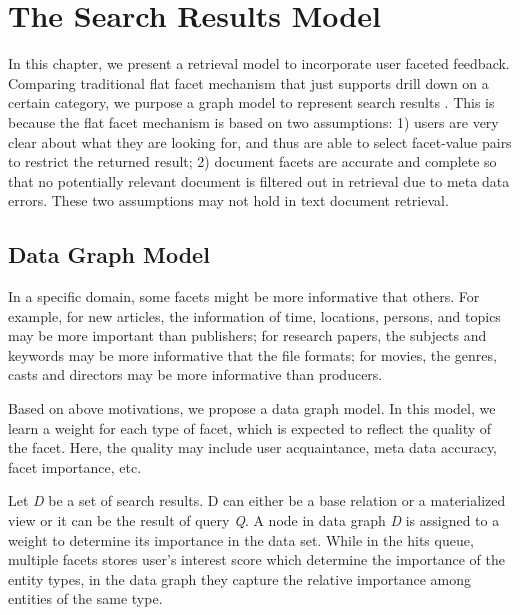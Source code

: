 \chapter{The Search Results Model}

In this chapter, we present a retrieval model to incorporate user faceted feedback. Comparing traditional flat facet mechanism that just supports drill down on a certain category, we purpose a graph model to represent search results . This is because the flat facet mechanism is based on two assumptions: 1) users are very clear about what they are looking for, and thus are able to select facet-value pairs to restrict the returned result; 2) document facets are accurate and complete so that no potentially relevant document is filtered out in retrieval due to meta data errors. These two assumptions may not hold in text document retrieval. 

\section{Data Graph Model}

In a specific domain, some facets might be more informative that others. For example, for new articles, the information of time, locations, persons, and topics may be more important than publishers; for research papers, the subjects and keywords may be more informative that the file formats; for movies, the genres, casts and directors may be more informative than producers.

Based on above motivations, we propose a data graph model. In this model, we learn a weight for each type of facet, which is expected to reflect the quality of the facet. Here, the quality may include user acquaintance, meta data accuracy, facet importance, etc.

Let {\it D} be a set of search results. D can either be a base relation or a materialized view or it can be the result of query {\it Q}. A node in data graph {\it D} is assigned to a weight to determine its importance in the data set. While in the hits queue, multiple facets stores user's interest score which determine the importance of the entity types, in the data graph they capture the relative importance among entities of the same type. 

